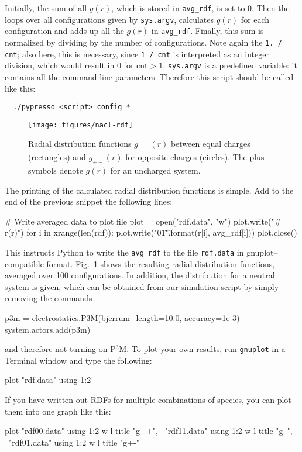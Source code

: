 \documentclass[
a4paper,                        %
11pt,                           %
twoside,                        %
footsepline,                    %
headsepline,                    %
headexclude,                    %
footexclude,                    %
pagesize,                       %
]{scrartcl}
\begin{document}
Initially, the sum of all $g(r)$, which is stored in \verb|avg_rdf|,
is set to 0.  Then the loops over all configurations given by
\verb|sys.argv|, calculates $g(r)$ for each configuration and adds up all
the $g(r)$ in \verb|avg_rdf|.  Finally, this sum is normalized by
dividing by the number of configurations. Note again the
\verb|1. / cnt|; also here, this is necessary, since \verb|1 / cnt| is 
interpreted as an integer division, which would result in 0 for $\text{cnt}>1$. 
 \verb|sys.argv| is a predefined variable: it contains all the command line 
parameters. Therefore this script should be called like this:
\begin{verbatim}
  ./pypresso <script> config_*
\end{verbatim}

\begin{figure}[tb]
  \centering
  \texttt{[image: figures/nacl-rdf]}
  \caption{Radial distribution functions $g_{++}(r)$ between equal
    charges (rectangles) and $g_{+-}(r)$ for opposite charges
    (circles). The plus symbols denote $g(r)$ for an uncharged
    system.}
  \label{fig:rdf}
\end{figure}

The printing of the calculated radial distribution functions is
simple. Add to the end of the previous snippet the following lines:

\begin{tclcode}
# Write averaged data to plot file
plot = open("rdf.data", "w")
plot.write("# r\trdf(r)\n")
for i in xrange(len(rdf)):
    plot.write("{0}\t{1}\n".format(r[i], avg_rdf[i]))
plot.close()
\end{tclcode}

This instructs Python to write the \verb|avg_rdf| to the
file \verb|rdf.data| in gnuplot--compatible format. Fig.~\ref{fig:rdf}
shows the resulting radial distribution functions, averaged over 100
configurations. In addition, the distribution for a neutral system is
given, which can be obtained from our simulation script by simply
removing the commands

\begin{tclcode}
    p3m = electrostatics.P3M(bjerrum_length=10.0, accuracy=1e-3)
    system.actors.add(p3m)
\end{tclcode}

and therefore not turning on P$^3$M.
To plot your own results, run \verb|gnuplot| in a Terminal window
and type the following:
\begin{tclcode}
plot "rdf.data" using 1:2	
\end{tclcode}
If you have written out RDFs for multiple combinations of species,
you can plot them into one graph like this:
\begin{tclcode}
plot "rdf00.data" using 1:2 w l title "g++", \
     "rdf11.data" using 1:2 w l title "g--", \
     "rdf01.data" using 1:2 w l title "g+-"	
\end{tclcode}
\end{document}
